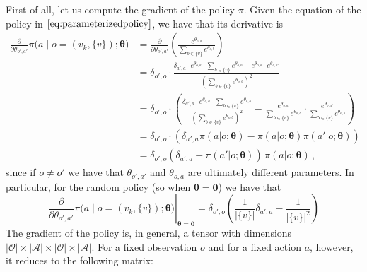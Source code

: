 First of all, let us compute the gradient of the policy $\pi$. Given the equation of the policy in $\eqref{eq:parameterizedpolicy}$, we have that its derivative is
\begin{equation}
    \begin{aligned}
        \frac{\partial}{\partial \theta_{o',a'}} \pi \Big( a \;\big|\; o=(v_k, \{v\}); \boldsymbol \theta \Big)
        &= \frac{\partial}{\partial \theta_{o',a'}} \left( \frac{e^{\theta_{o,a} }}{\sum_{b \in \{v\}} e^{\theta_{o,b} }} \right) \\
        &= \delta_{o',o} \cdot \frac{\delta_{a',a} \cdot e^{\theta_{o,a} } \cdot \sum_{b \in \{v\}} e^{\theta_{o,b} } -  e^{\theta_{o,a} } \cdot e^{\theta_{o, a'} }}{(\sum_{b \in \{v\}} e^{\theta_{o,b}})^2} \\
        &= \delta_{o',o} \cdot \left( \frac{\delta_{a',a} \cdot e^{\theta_{o,a} } \cdot \sum_{b \in \{v\}} e^{\theta_{o,b} }}{(\sum_{b \in \{v\}} e^{\theta_{o,b} })^2} - \frac{e^{\theta_{o,a} }}{\sum_{b \in \{v\}} e^{\theta_{o,b} }}\cdot\frac{e^{\theta_{o,a'} }}{\sum_{b \in \{v\}} e^{\theta_{o,b} }} \right) \\
        &= \delta_{o',o} \cdot \left( \delta_{a',a} \pi(a|o; \boldsymbol \theta) - \pi(a|o; \boldsymbol \theta) \pi(a'|o; \boldsymbol \theta) \right) \\
        &= \delta_{o',o} \left( \delta_{a',a} - \pi(a'|o; \boldsymbol \theta) \right) \, \pi(a|o; \boldsymbol \theta)  \, ,
    \end{aligned}
    \label{eq:gradpi}
\end{equation}
since if $o \neq o'$ we have that $\theta_{o',a'}$ and $\theta_{o,a}$ are ultimately different parameters. In particular, for the random policy (so when $\boldsymbol \theta = \mathbf 0$) we have that
\begin{equation}
    \left. \frac{\partial}{\partial \theta_{o',a'}} \pi \Big( a \;\big|\; o=(v_k, \{v\}); \boldsymbol \theta \Big) \right|_{\boldsymbol \theta = \mathbf 0}
    = \delta_{o',o} \left(\frac1{|\{v\}|} \delta_{a',a} - \frac1{|\{v\}|^2} \right)
    \label{eq:deriv-pi}
\end{equation}
The gradient of the policy is, in general, a tensor with dimensions $|\mathcal O| \times |\mathcal A| \times |\mathcal O| \times |\mathcal A|$. For a fixed observation $o$ and for a fixed action $a$, however, it reduces to the following matrix:
